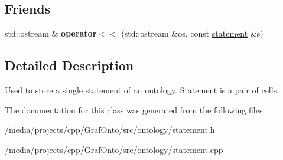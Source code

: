 \subsection*{\-Friends}
\begin{DoxyCompactItemize}
\item 
\hypertarget{classmbdev__ontology_1_1statement_a7aabf5e95163ab47ab639660ec084aad}{std\-::ostream \& {\bfseries operator$<$$<$} (std\-::ostream \&os, const \hyperlink{classmbdev__ontology_1_1statement}{statement} \&s)}\label{classmbdev__ontology_1_1statement_a7aabf5e95163ab47ab639660ec084aad}

\end{DoxyCompactItemize}


\subsection{\-Detailed \-Description}
\-Used to store a single statement of an ontology. \-Statement is a pair of cells. 

\-The documentation for this class was generated from the following files\-:\begin{DoxyCompactItemize}
\item 
/media/projects/cpp/\-Graf\-Onto/src/ontology/statement.\-h\item 
/media/projects/cpp/\-Graf\-Onto/src/ontology/statement.\-cpp\end{DoxyCompactItemize}

